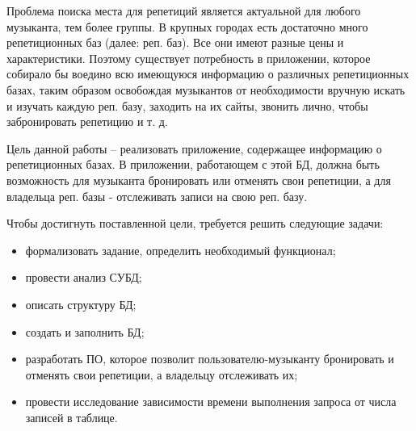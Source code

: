 
Проблема поиска места для репетиций является актуальной для любого музыканта, тем более группы. В крупных городах есть достаточно много репетиционных баз (далее: реп. баз). Все они имеют разные цены и характеристики. Поэтому существует потребность в приложении, которое собирало бы воедино всю имеющуюся информацию о различных репетиционных базах, таким образом освобождая музыкантов от необходимости вручную искать и изучать каждую реп. базу, заходить на их сайты, звонить лично, чтобы забронировать репетицию и т. д.

Цель данной работы – реализовать приложение, содержащее информацию о репетиционных базах. В приложении, работающем с этой БД, должна быть возможность для музыканта бронировать или отменять свои репетиции, а для владельца реп. базы - отслеживать записи на свою реп. базу.

Чтобы достигнуть поставленной цели, требуется решить следующие задачи:
\begin{itemize}
	\item формализовать задание, определить необходимый функционал;
	\item провести анализ СУБД;
	\item описать структуру БД;
	\item создать и заполнить БД;
	\item разработать ПО, которое позволит пользователю-музыканту бронировать и отменять свои репетиции, а владельцу отслеживать их;
	\item провести исследование зависимости времени выполнения запроса от числа записей в таблице.
\end{itemize}